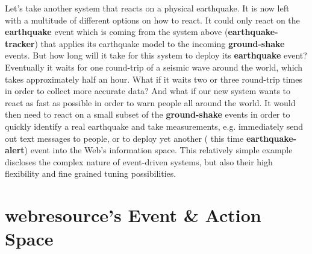 Let's take another system that reacts on a physical earthquake.
It is now left with a multitude of different options on how to react.
It could only react on the \textrm{\textbf{earthquake}} event which is coming from the system above (\textrm{\textbf{earthquake-tracker}}) that applies its earthquake model to the incoming \textrm{\textbf{ground-shake}} events.
But how long will it take for this system to deploy its \textrm{\textbf{earthquake}} event?
Eventually it waits for one round-trip of a seismic wave around the world, which takes approximately half an hour.
What if it waits two or three round-trip times in order to collect more accurate data?
And what if our new system wants to react as fast as possible in order to warn people all around the world.
It would then need to react on a small subset of the \textrm{\textbf{ground-shake}} events in order to quickly identify a real earthquake and take measurements, e.g. immediately send out text messages to people, or to deploy yet another ( this time \textrm{\textbf{earthquake-alert}}) event into the Web's information space.
This relatively simple example discloses the complex nature of event-driven systems, but also their high flexibility and fine grained tuning possibilities.



\section{\gls{webresource}'s Event \& Action Space}


